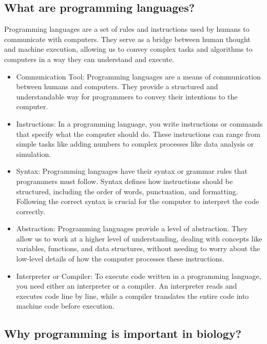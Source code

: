 \documentclass[
]{book}
\begin{document}
\hypertarget{what-are-programming-languages}{%
\subsection{What are programming languages?}\label{what-are-programming-languages}}

Programming languages are a set of rules and instructions used by humans to communicate with computers. They serve as a bridge between human thought and machine execution, allowing us to convey complex tasks and algorithms to computers in a way they can understand and execute.

\begin{itemize}
\item
  Communication Tool: Programming languages are a means of communication between humans and computers. They provide a structured and understandable way for programmers to convey their intentions to the computer.
\item
  Instructions: In a programming language, you write instructions or commands that specify what the computer should do. These instructions can range from simple tasks like adding numbers to complex processes like data analysis or simulation.
\item
  Syntax: Programming languages have their syntax or grammar rules that programmers must follow. Syntax defines how instructions should be structured, including the order of words, punctuation, and formatting. Following the correct syntax is crucial for the computer to interpret the code correctly.
\item
  Abstraction: Programming languages provide a level of abstraction. They allow us to work at a higher level of understanding, dealing with concepts like variables, functions, and data structures, without needing to worry about the low-level details of how the computer processes these instructions.
\item
  Interpreter or Compiler: To execute code written in a programming language, you need either an interpreter or a compiler. An interpreter reads and executes code line by line, while a compiler translates the entire code into machine code before execution.
\end{itemize}

\hypertarget{why-programming-is-important-in-biology}{%
\subsection{Why programming is important in biology?}\label{why-programming-is-important-in-biology}}
\end{document}
